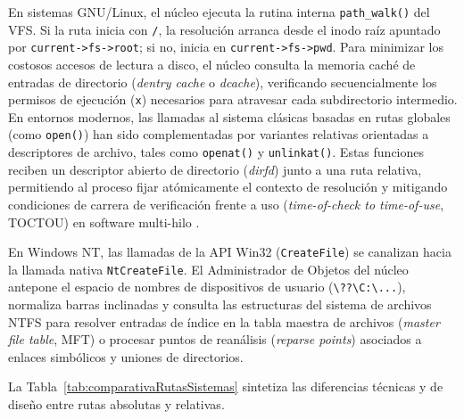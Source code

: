 \documentclass[12pt]{article}
\begin{document}
En sistemas GNU/Linux, el núcleo ejecuta la rutina interna \texttt{path\_walk()} del VFS. Si la ruta inicia con \texttt{/}, la resolución arranca desde el inodo raíz apuntado por \texttt{current->fs->root}; si no, inicia en \texttt{current->fs->pwd}. Para minimizar los costosos accesos de lectura a disco, el núcleo consulta la memoria caché de entradas de directorio (\textit{dentry cache} o \textit{dcache}), verificando secuencialmente los permisos de ejecución (\texttt{x}) necesarios para atravesar cada subdirectorio intermedio. En entornos modernos, las llamadas al sistema clásicas basadas en rutas globales (como \texttt{open()}) han sido complementadas por variantes relativas orientadas a descriptores de archivo, tales como \texttt{openat()} y \texttt{unlinkat()}. Estas funciones reciben un descriptor abierto de directorio (\textit{dirfd}) junto a una ruta relativa, permitiendo al proceso fijar atómicamente el contexto de resolución y mitigando condiciones de carrera de verificación frente a uso (\textit{time-of-check to time-of-use}, TOCTOU) en software multi-hilo \parencite{carretero2001sistemas}.

En Windows NT, las llamadas de la API Win32 (\texttt{CreateFile}) se canalizan hacia la llamada nativa \texttt{NtCreateFile}. El Administrador de Objetos del núcleo antepone el espacio de nombres de dispositivos de usuario (\texttt{\textbackslash ??\textbackslash C:\textbackslash...}), normaliza barras inclinadas y consulta las estructuras del sistema de archivos NTFS para resolver entradas de índice en la tabla maestra de archivos (\textit{master file table}, MFT) o procesar puntos de reanálisis (\textit{reparse points}) asociados a enlaces simbólicos y uniones de directorios.

La Tabla~\ref{tab:comparativaRutasSistemas} sintetiza las diferencias técnicas y de diseño entre rutas absolutas y relativas.
\end{document}
